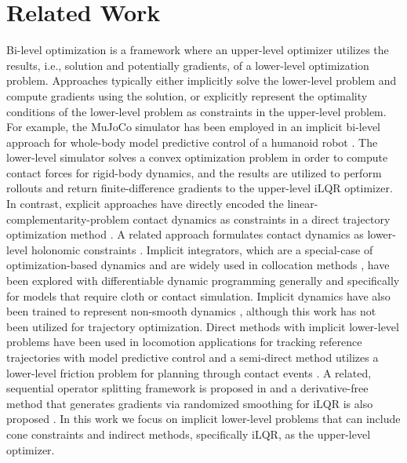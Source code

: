 \section{Related Work}\label{od_related_work}
Bi-level optimization \cite{sinha2017review} is a framework where an upper-level optimizer utilizes the results, i.e., solution and potentially gradients, of a lower-level optimization problem. Approaches typically either implicitly solve the lower-level problem and compute gradients using the solution, or explicitly represent the optimality conditions of the lower-level problem as constraints in the upper-level problem. For example, the MuJoCo simulator \cite{todorov2012mujoco} has been employed in an implicit bi-level approach for whole-body model predictive control of a humanoid robot \cite{koenemann2015whole}. The lower-level simulator solves a convex optimization problem in order to compute contact forces for rigid-body dynamics, and the results are utilized to perform rollouts and return finite-difference gradients to the upper-level iLQR optimizer. In contrast, explicit approaches have directly encoded the linear-complementarity-problem contact dynamics as constraints in a direct trajectory optimization method \cite{yunt2006trajectory, posa2014direct}. A related approach formulates contact dynamics as lower-level holonomic constraints \cite{mastalli2020crocoddyl}. Implicit integrators, which are a special-case of optimization-based dynamics and are widely used in collocation methods \cite{stryk1993numerical}, have been explored with differentiable dynamic programming generally \cite{jallet2022implicit} and specifically for models that require cloth \cite{zimmermann2021dynamic} or contact \cite{chatzinikolaidis2021trajectory} simulation. Implicit dynamics have also been trained to represent non-smooth dynamics \cite{pfrommer2021contactnets}, although this work has not been utilized for trajectory optimization. Direct methods with implicit lower-level problems have been used in locomotion applications for tracking reference trajectories with model predictive control \cite{lecleach2021fast} and a semi-direct method utilizes a lower-level friction problem for planning through contact events \cite{landry2019bilevel}. A related, sequential operator splitting framework is proposed in \cite{sindhwani2017sequential} and a derivative-free method that generates gradients via randomized smoothing for iLQR is also proposed \cite{suh2022bundled}. In this work we focus on implicit lower-level problems that can include cone constraints and indirect methods, specifically iLQR, as the upper-level optimizer.


